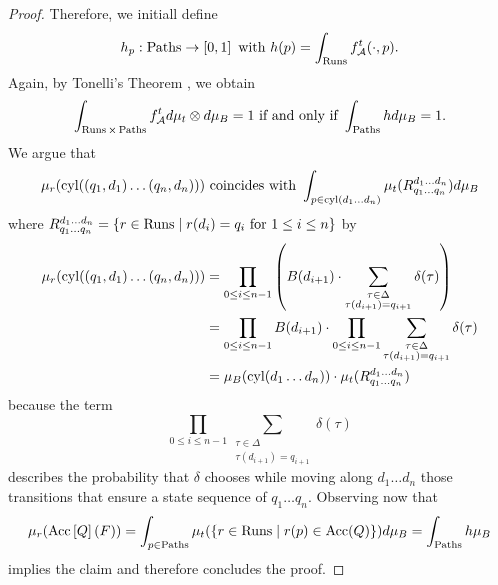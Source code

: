 \begin{proof}
  Therefore, we initiall define
  \begin{equation*}
    h_{p}:\operatorname{Paths}\rightarrow\left[0,1\right]\text{ with }
      h(p) = \int_{\operatorname{Runs}}f_{\mathcal{A}}^{t}(\cdot, p).
  \end{equation*}
  Again, by Tonelli's Theorem \cite{Bauer}, we obtain
  \begin{equation*}
    \int_{\operatorname{Runs}\times\operatorname{Paths}}f_{\mathcal{A}}^{t}d\mu_{t}\otimes d\mu_{B} = 1
    \text{ if and only if }\int_{\operatorname{Paths}}h d\mu_{B} = 1.
  \end{equation*}
  We argue that 
  \begin{equation*}
    \mu_{r}(\operatorname{cyl}(\left(q_{1}, d_{1}\right)\dots\left(q_{n}, d_{n}\right)))
    \text{ coincides with }\int_{p\in\operatorname{cyl}(d_{1}\dots d_{n})}\mu_{t}(
    R^{d_{1}\dots d_{n}}_{q_{1}\dots q_{n}})d\mu_{B}
  \end{equation*} where $R^{d_{1}\dots d_{n}}_{q_{1}\dots q_{n}} = \left\{
    r\in\operatorname{Runs}\mid r(d_{i}) = q_{i}\text{ for }1\leq i\leq n\right\}$ by
  \begin{align*}
    \mu_{r}(\operatorname{cyl}(\left(q_{1}, d_{1}\right)\dots\left(q_{n}, d_{n}\right))) &=
      \prod\limits_{0\leq i\leq n-1}\left(B(d_{i+1})\cdot\sum\limits_{
        \substack{\tau\in\Delta\\\tau(d_{i+1}) = q_{i+1}}}\delta(\tau)\right)\\
    &=\prod\limits_{0\leq i\leq n-1}B(d_{i+1})\cdot\prod
        \limits_{0\leq i\leq n-1}\sum\limits_{\substack{
        \tau\in\Delta\\\tau(d_{i+1}) = q_{i+1}}}\delta(\tau)\\
    &=\mu_{B}(\operatorname{cyl}(d_{1}\dots d_{n}))\cdot\mu_{t}(
        R^{d_{1}\dots d_{n}}_{q_{1}\dots q_{n}})\\
  \end{align*}
  because the term
  \begin{equation*}
    \prod\limits_{0\leq i\leq n-1}\sum\limits_{\substack{
    \tau\in\Delta\\\tau(d_{i+1}) = q_{i+1}}}\delta(\tau)
  \end{equation*} 
  describes the probability that $\delta$ chooses while moving along
  $d_{1}\dots d_{n}$ those transitions that ensure a state sequence  of
  $q_{1}\dots q_{n}$. Observing now that
  \begin{equation*}
    \mu_{r}(\operatorname{Acc}\left[Q\right](F)) = 
    \int_{p\in\operatorname{Paths}}\mu_{t}(\left\{r\in\operatorname{Runs}\mid r(p)\in\operatorname{Acc}(Q)\right\}) d\mu_{B} = 
    \int_{\operatorname{Paths}} h\mu_{B}
  \end{equation*}
  implies the claim and therefore concludes the proof.
\end{proof}
